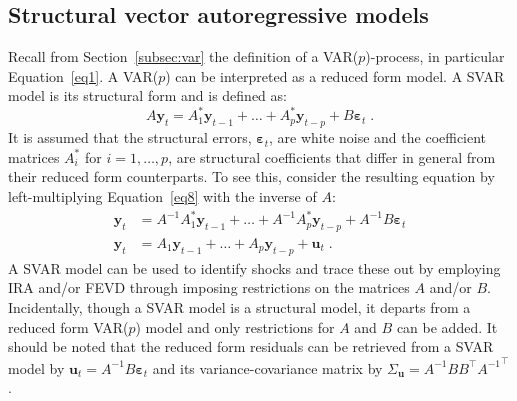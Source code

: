 \documentclass[nojss]{jss}
\begin{document}
\subsection{Structural vector autoregressive models}
\label{subsec:svar}
Recall from Section~\ref{subsec:var} %
the definition of a VAR($p$)-process, in particular Equation~\ref{eq1}. A
VAR($p$) can be interpreted as a reduced form model. A SVAR model is its
structural form and is defined as:  
\begin{equation}
\label{eq8}
A \bm{y}_t = A_1^* \bm{y}_{t-1} + \ldots + A_p^*
\bm{y}_{t-p} + B \bm{\varepsilon}_t \; . 
\end{equation}
It is assumed that the structural errors,
$\bm{\varepsilon}_t$, are white noise and the coefficient matrices
$A_i^*$ for $i = 1, \ldots, p$, are structural coefficients that
differ in general from their reduced form counterparts. To see this,
consider the resulting equation by left-multiplying Equation~\ref{eq8} with the inverse of $A$: 
\begin{equation}
\label{eq9}
\begin{split}
\bm{y}_t & = A^{-1} A_1^* \bm{y}_{t-1} + \ldots + A^{-1} A_p^* \bm{y}_{t-p} + A^{-1} B \bm{\varepsilon}_t \\
\bm{y}_t & = A_1 \bm{y}_{t-1} + \ldots + A_p \bm{y}_{t-p}
+ \bm{u}_t \; . 
\end{split}
\end{equation}
A SVAR model can be used to identify shocks and trace these out by
employing IRA and/or FEVD through imposing restrictions on the
matrices $A$ and/or $B$. Incidentally, though a SVAR model is a
structural model, it departs from a reduced form VAR($p$) model and only
restrictions for $A$ and $B$ can be added. It should be noted that the
reduced form residuals can be retrieved from a SVAR model by
$\bm{u}_t = A^{-1} B \bm{\varepsilon}_t$ and its
variance-covariance matrix by $\Sigma_{\bm{u}} = A^{-1} B B^\top
{A^{-1}}^\top$.
\end{document}

